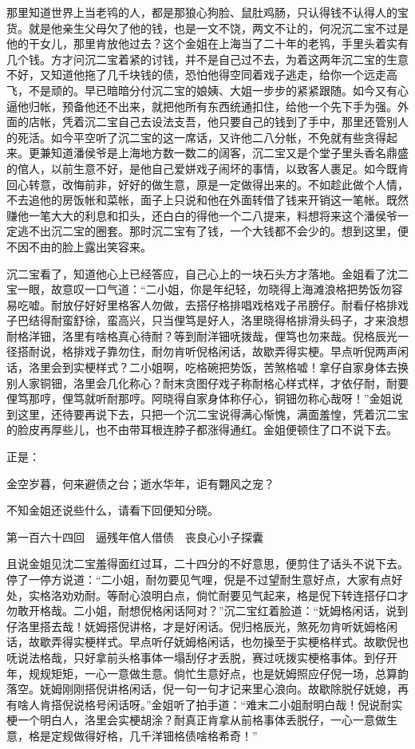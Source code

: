 \documentclass[12pt,UTF8]{ctexbook}
\begin{document}
{{{那里知道世界上当老鸨的人，都是那狼心狗脸、鼠肚鸡肠，只认得钱不认得人的宝货。就是他亲生父母欠了他的钱，也是一文不饶，两文不让的，何况沉二宝不过是他的干女儿，那里肯放他过去？这个金姐在上海当了二十年的老鸨，手里头着实有几个钱。方才问沉二宝着紧的讨钱，并不是自己过不去，为着这两年沉二宝的生意不好，又知道他拖了几千块钱的债，恐怕他得空同着戏子逃走，给你一个远走高飞，不是顽的。早已暗暗分付沉二宝的娘姨、大姐一步步的紧紧跟随。如今又有心逼他归帐，预备他还不出来，就把他所有东西统通扣住，给他一个先下手为强。外面的店帐，凭着沉二宝自己去设法支吾，他只要自己的钱到了手中，那里还管别人的死活。如今平空听了沉二宝的这一席话，又许他二八分帐，不免就有些贪得起来。更兼知道潘侯爷是上海地方数一数二的阔客，沉二宝又是个堂子里头香名鼎盛的倌人，以前生意不好，是他自己爱姘戏子闹坏的事情，以致客人裹足。如今既肯回心转意，改悔前非，好好的做生意，原是一定做得出来的。不如趁此做个人情，不去追他的房饭帐和菜帐，面子上只说和他在外面转借了钱来开销这一笔帐。既然赚他一笔大大的利息和扣头，还白白的得他一个二八提来，料想将来这个潘侯爷一定逃不出沉二宝的圈套。那时沉二宝有了钱，一个大钱都不会少的。想到这里，便不因不由的脸上露出笑容来。

沉二宝看了，知道他心上已经答应，自己心上的一块石头方才落地。金姐看了沈二宝一眼，故意叹一口气道：“二小姐，你是年纪轻，勿晓得上海滩浪格把势饭勿容易吃嘘。耐放仔好好里格客人勿做，去搭仔格排唱戏格戏子吊膀仔。耐看仔格排戏子巴结得耐蛮舒徐，蛮高兴，只当俚笃是好人，洛里晓得格排滑头码子，才来浪想耐格洋钿，洛里有啥格真心待耐？等到耐洋钿呒拨哉，俚笃也勿来哉。倪格辰光一径搭耐说，格排戏子靠勿住，耐勿肯听倪格闲话，故歇弄得实梗。早点听倪两声闲话，洛里会到实梗样式？二小姐啊，吃格碗把势饭，苦煞格嘘！拿仔自家身体去换别人家铜钿，洛里会几化称心？耐末贪图仔戏子称耐格心样式样，才依仔耐，耐要俚笃那哼，俚笃就听耐那哼。阿晓得自家身体称仔心，铜钿勿称心哉呀！”金姐说到这里，还待要再说下去，只把一个沉二宝说得满心惭愧，满面羞惶，凭着沉二宝的脸皮再厚些儿，也不由带耳根连脖子都涨得通红。金姐便顿住了口不说下去。

正是：

金空岁暮，何来避债之台；逝水华年，讵有翾风之宠？

不知金姐还说些什么，请看下回便知分晓。





第一百六十四回　逼残年倌人借债　丧良心小子探囊



且说金姐见沈二宝羞得面红过耳，二十四分的不好意思，便剪住了话头不说下去。停了一停方说道：“二小姐，耐勿要见气哩，倪是不过望耐生意好点，大家有点好处，实格洛劝劝耐。等耐心浪明白点，倘忙耐要见气起来，格是倪下转连搭仔口才勿敢开格哉。二小姐，耐想倪格闲话阿对？”沉二宝红着脸道：“妩姆格闲话，说到仔洛里搭去哉！妩姆搭倪讲格，才是好闲话。倪归格辰光，煞死勿肯听妩姆格闲话，故歇弄得实梗样式。早点听仔妩姆格闲话，也勿操至于实梗格样式。故歇倪也呒说法格哉，只好拿前头格事体一塌刮仔才丢脱，赛过呒拨实梗格事体。到仔开年，规规矩矩，一心一意做生意。倘忙生意好点，也是妩姆照应仔倪一场，总算韵落空。妩姆刚刚搭倪讲格闲话，倪一句一句才记来里心浪向。故歇除脱仔妩媳，再有啥人肯搭倪说格号闲话呀。”金姐听了拍手道：“难末二小姐耐明白哉！倪说耐实梗一个明白人，洛里会实梗胡涂？耐真正肯拿从前格事体丢脱仔，一心一意做生意，格是定规做得好格，几千洋钿格债啥格希奇！”

}}}
\end{document}
